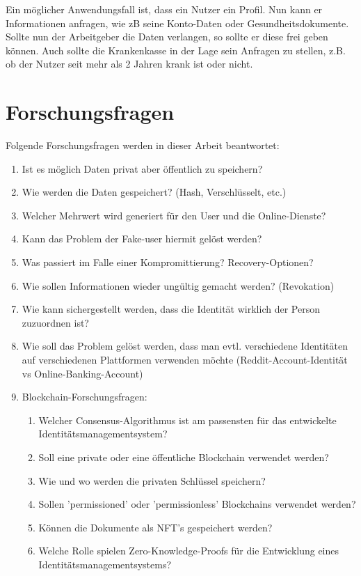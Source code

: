 Ein möglicher Anwendungsfall ist, dass ein Nutzer ein Profil. Nun kann er Informationen anfragen, wie zB seine Konto-Daten oder Gesundheitsdokumente. Sollte nun der Arbeitgeber die Daten verlangen, so sollte er diese frei geben können. Auch sollte die Krankenkasse in der Lage sein Anfragen zu stellen, z.B. ob der Nutzer seit mehr als 2 Jahren krank ist oder nicht.

\section{Forschungsfragen}
\label{forschungsfragen}
Folgende Forschungsfragen werden in dieser Arbeit beantwortet:
\begin{enumerate}
	\item Ist es möglich Daten privat aber öffentlich zu speichern?
	\item Wie werden die Daten gespeichert? (Hash, Verschlüsselt, etc.) 
	\item Welcher Mehrwert wird generiert für den User und die Online-Dienste?
	\item Kann das Problem der Fake-user hiermit gelöst werden?
	\item Was passiert im Falle einer Kompromittierung?  Recovery-Optionen?
	\item Wie sollen Informationen wieder ungültig gemacht werden? (Revokation)
	\item Wie kann sichergestellt werden, dass die Identität wirklich der Person zuzuordnen ist?
	\item Wie soll das Problem gelöst werden, dass man evtl. verschiedene Identitäten auf verschiedenen Plattformen verwenden möchte (Reddit-Account-Identität vs Online-Banking-Account)
	\item Blockchain-Forschungsfragen:
	\begin{enumerate}
		\item Welcher Consensus-Algorithmus ist am passensten für das entwickelte Identitätsmanagementsystem?
		\item Soll eine private oder eine öffentliche Blockchain verwendet werden?
		\item Wie und wo werden die privaten Schlüssel speichern?
		\item Sollen 'permissioned' oder 'permissionless' Blockchains verwendet werden?
		\item Können die Dokumente als NFT's gespeichert werden?
		\item Welche Rolle spielen Zero-Knowledge-Proofs für die Entwicklung eines Identitätsmanagementsystems?
	\end{enumerate}	
\end{enumerate}


